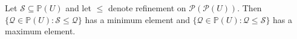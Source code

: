 Let $\mathcal{S} \subseteq \mathbb{P}(U)$ and let $\leq$ denote refinement on $\mathcal{P}(\mathcal{P}(U))$. Then $\{ \mathcal{Q} \in \mathbb{P}(U) : \mathcal{S} \leq \mathcal{Q} \}$ has a minimum element and $\{ \mathcal{Q} \in \mathbb{P}(U) : \mathcal{Q} \leq \mathcal{S} \}$ has a maximum element.
